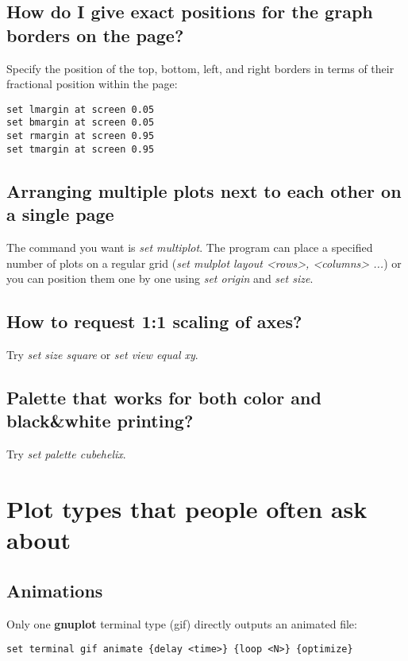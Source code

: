 \documentclass[a4paper,11pt]{article}
\newcommand{\gnuplot}{\textbf{gnuplot }}
\begin{document}
\subsection{How do I give exact positions for the graph borders on the page?}

Specify the position of the top, bottom, left, and right borders in
terms of their fractional position within the page:

\small
\begin{verbatim}
set lmargin at screen 0.05
set bmargin at screen 0.05
set rmargin at screen 0.95
set tmargin at screen 0.95
\end{verbatim}
\normalsize

\subsection{Arranging multiple plots next to each other on a single page}

The command you want is {\em set multiplot}.  The program can place
a specified number of plots on a regular grid
({\em set mulplot layout <rows>, <columns> ...}) or you can position them
one by one using {\em set origin} and {\em set size}.

\subsection{How to request 1:1 scaling of axes?}

Try {\em set size square} or {\em set view equal xy}.

\subsection{Palette that works for both color and black\&white printing?}

Try {\em set palette cubehelix}.

\section{Plot types that people often ask about}

\subsection{Animations}

Only one \gnuplot terminal type (gif) directly outputs an animated file:
\begin{verbatim}
set terminal gif animate {delay <time>} {loop <N>} {optimize}
\end{verbatim}
\end{document}
